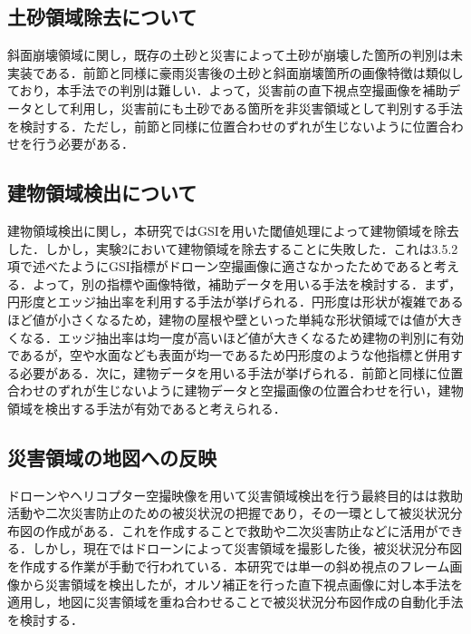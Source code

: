 \documentclass[../Thesis]{subfiles}
\begin{document}
\subsection{土砂領域除去について}
	斜面崩壊領域に関し，既存の土砂と災害によって土砂が崩壊した箇所の判別は未実装である．前節と同様に豪雨災害後の土砂と斜面崩壊箇所の画像特徴は類似しており，本手法での判別は難しい．よって，災害前の直下視点空撮画像を補助データとして利用し，災害前にも土砂である箇所を非災害領域として判別する手法を検討する．ただし，前節と同様に位置合わせのずれが生じないように位置合わせを行う必要がある．
	

\subsection{建物領域検出について}
    建物領域検出に関し，本研究ではGSIを用いた閾値処理によって建物領域を除去した．しかし，実験2において建物領域を除去することに失敗した．これは3.5.2項で述べたようにGSI指標がドローン空撮画像に適さなかったためであると考える．よって，別の指標や画像特徴，補助データを用いる手法を検討する．まず，円形度とエッジ抽出率を利用する手法が挙げられる．円形度は形状が複雑であるほど値が小さくなるため，建物の屋根や壁といった単純な形状領域では値が大きくなる．エッジ抽出率は均一度が高いほど値が大きくなるため建物の判別に有効であるが，空や水面なども表面が均一であるため円形度のような他指標と併用する必要がある．次に，建物データを用いる手法が挙げられる．前節と同様に位置合わせのずれが生じないように建物データと空撮画像の位置合わせを行い，建物領域を検出する手法が有効であると考えられる．

\subsection{災害領域の地図への反映}
	ドローンやヘリコプター空撮映像を用いて災害領域検出を行う最終目的はは救助活動や二次災害防止のための被災状況の把握であり，その一環として被災状況分布図の作成がある．これを作成することで救助や二次災害防止などに活用ができる．しかし，現在ではドローンによって災害領域を撮影した後，被災状況分布図を作成する作業が手動で行われている\cite{art02}．本研究では単一の斜め視点のフレーム画像から災害領域を検出したが，オルソ補正を行った直下視点画像に対し本手法を適用し，地図に災害領域を重ね合わせることで被災状況分布図作成の自動化手法を検討する．


\end{document}
